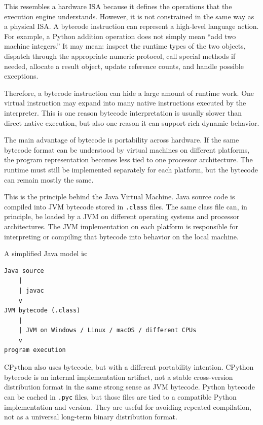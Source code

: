 \documentclass[a4paper,twoside]{report}
\begin{document}
This resembles a hardware ISA because it defines the operations that the execution engine understands. However, it is not constrained in the same way as a physical ISA. A bytecode instruction can represent a high-level language action. For example, a Python addition operation does not simply mean ``add two machine integers.'' It may mean: inspect the runtime types of the two objects, dispatch through the appropriate numeric protocol, call special methods if needed, allocate a result object, update reference counts, and handle possible exceptions.

Therefore, a bytecode instruction can hide a large amount of runtime work. One virtual instruction may expand into many native instructions executed by the interpreter. This is one reason bytecode interpretation is usually slower than direct native execution, but also one reason it can support rich dynamic behavior.

The main advantage of bytecode is portability across hardware. If the same bytecode format can be understood by virtual machines on different platforms, the program representation becomes less tied to one processor architecture. The runtime must still be implemented separately for each platform, but the bytecode can remain mostly the same.

This is the principle behind the Java Virtual Machine. Java source code is compiled into JVM bytecode stored in \texttt{.class} files. The same class file can, in principle, be loaded by a JVM on different operating systems and processor architectures. The JVM implementation on each platform is responsible for interpreting or compiling that bytecode into behavior on the local machine.

A simplified Java model is:

\begin{verbatim}
Java source
    |
    | javac
    v
JVM bytecode (.class)
    |
    | JVM on Windows / Linux / macOS / different CPUs
    v
program execution
\end{verbatim}

CPython also uses bytecode, but with a different portability intention. CPython bytecode is an internal implementation artifact, not a stable cross-version distribution format in the same strong sense as JVM bytecode. Python bytecode can be cached in \texttt{.pyc} files, but those files are tied to a compatible Python implementation and version. They are useful for avoiding repeated compilation, not as a universal long-term binary distribution format.
\end{document}
